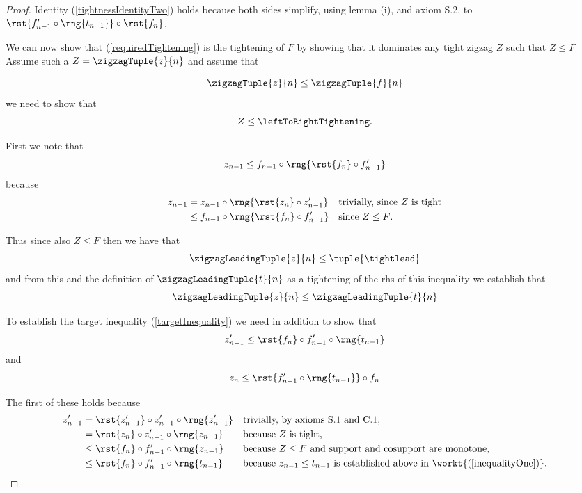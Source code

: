 {\begin{proof}
Identity (\ref{tightnessIdentityTwo}) holds  because both sides  simplify, using lemma (i), and axiom S.2, 
to $\rst{f'_{n-1} \circ \rng{t_{n-1}}} \circ \rst{f_n}$.

We can now show that (\ref{requiredTightening})
is the tightening of $F$ by showing that 
it dominates any tight zigzag $Z$ such that
$Z \leq F$ 
Assume such a $Z=\zigzagTuple{z}{n}$ and assume that

\[
\zigzagTuple{z}{n} \leq \zigzagTuple{f}{n}
\]
we need to show that 
\begin{equation}
\label{targetInequality}
Z \leq \leftToRightTightening.
\end{equation} 

First we note that  
\[
 z_{n-1} \leq f_{n-1} \circ 
       \rng{
                \rst{f_n} \circ f'_{n-1}
                     }
\]
because 
\begin{align*}
z_{n-1} &= z_{n-1} \circ \rng{\rst{z_n} \circ z'_{n-1}} && \mbox{trivially, since $Z$ is tight}\\
&\leq  f_{n-1} \circ 
       \rng{
                \rst{f_n} \circ f'_{n-1}
                     } &&\mbox{\parbox{3cm}{since $Z \leq F$.}}
\end{align*}

Thus since also $Z \leq F$ then we have that
\[
\zigzagLeadingTuple{z}{n} \leq \tuple{\tightlead}
\] 
and from this and the definition of $\zigzagLeadingTuple{t}{n}$
as a tightening of the rhs of this inequality we establish that
\begin{equation}
\label{inequalityOne}
\zigzagLeadingTuple{z}{n} \leq \zigzagLeadingTuple{t}{n}
\end{equation}
 
To establish the target inequality (\ref{targetInequality})
we need 
in addition to show that
 \begin{equation}
 \label{inequalityTwo}
 z'_{n-1} \leq \rst{f_n} \circ f'_{n-1} \circ \rng{t_{n-1}}
 \end{equation}
 and
  \begin{equation}
 \label{inequalityThree}
 z_n \leq \rst{f'_{n-1} \circ \rng{t_{n-1}}} \circ f_n
 \end{equation}

The first of these holds because
\begin{align*}
z'_{n-1} &= \rst{z'_{n-1}} \circ z'_{n-1}  \circ \rng{z'_{n-1}} 
                && \mbox{trivially, by axioms S.1 and C.1,}\\
         &= \rst{z_n} \circ z'_{n-1}  \circ \rng{z_{n-1}} 
         &&\mbox{because $Z$ is tight,}\\
         &\leq \rst{f_n} \circ f'_{n-1}  \circ \rng{z_{n-1}}
         &&\mbox{because $Z \leq F$ and support and cosupport are monotone,}\\
         &\leq \rst{f_n} \circ f'_{n-1}  \circ \rng{t_{n-1}}
         &&\mbox{because $z_{n-1} \leq t_{n-1}$ is established
                               above in \workt{(\ref{inequalityOne})}.}
\end{align*}


\end{proof}}
